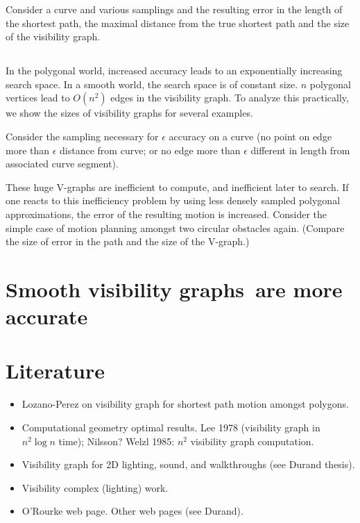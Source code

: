 \documentclass[11pt,twocolumn]{article}
\newcommand{\vgraphs}{visibility graphs\ }
\begin{document}
Consider a curve and various samplings and the resulting error
in the length of the shortest path, the maximal distance from the
true shortest path and the size of the visibility graph.

\subsection{}

In the polygonal world, increased accuracy leads to an exponentially
increasing search space.
In a smooth world, the search space is of constant size.
$n$ polygonal vertices lead to $O(n^2)$ edges in the visibility graph.
To analyze this practically, we show the sizes of visibility graphs 
for several examples.

Consider the sampling necessary for $\epsilon$ accuracy on a curve
(no point on edge more than $\epsilon$ distance from curve;
or no edge more than $\epsilon$ different in length from associated
curve segment).

These huge V-graphs are inefficient to compute, and inefficient later to search.
If one reacts to this inefficiency problem by using
less densely sampled polygonal approximations,
the error of the resulting motion is increased.
Consider the simple case of motion planning amongst two circular obstacles again.
(Compare the size of error in the path and the size of the V-graph.)

\section{Smooth \vgraphs are more accurate}
\label{sec:accuracy}

\section{Literature}
\label{sec:lit}

\begin{itemize}
\item
	Lozano-Perez on visibility graph for shortest path motion amongst polygons.
\item
	Computational geometry optimal results.
	Lee 1978 (visibility graph in $n^2 \log n$ time);
	Nilsson?
	Welzl 1985: $n^2$ visibility graph computation.
\item
	Visibility graph for 2D lighting, sound, and walkthroughs 
	(see Durand thesis).
\item
	Visibility complex (lighting) work.
\item
	O'Rourke web page.
	Other web pages (see Durand).
\end{itemize}
\end{document}
